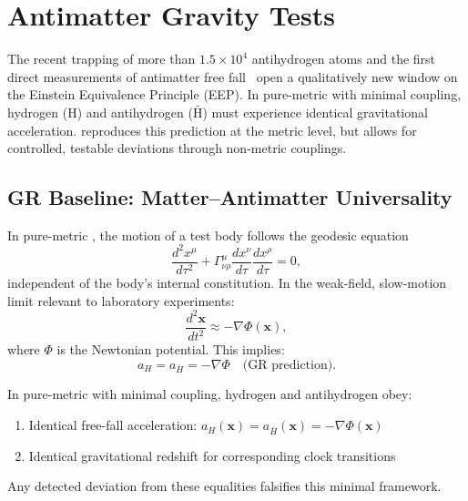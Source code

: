 
\section{Antimatter Gravity Tests}\label{sec:antimatter}

The recent trapping of more than $1.5 \times 10^4$ antihydrogen atoms and the 
first direct measurements of antimatter free fall~\cite{ALPHA2023Nature,ALPHA2025NatComm} 
open a qualitatively new window on the Einstein Equivalence Principle (EEP). 
In pure-metric \GR with minimal coupling, hydrogen (H) and antihydrogen 
($\bar{\text{H}}$) must experience identical gravitational acceleration. 
\DFD reproduces this prediction at the metric level, but allows for 
controlled, testable deviations through non-metric couplings.

\subsection{GR Baseline: Matter--Antimatter Universality}\label{sec:antimatter-gr}

In pure-metric \GR, the motion of a test body follows the geodesic equation
\begin{equation}
\frac{d^2 x^\mu}{d\tau^2} + \Gamma^\mu_{\nu\rho}\frac{dx^\nu}{d\tau}\frac{dx^\rho}{d\tau} = 0,
\end{equation}
independent of the body's internal constitution. In the weak-field, slow-motion 
limit relevant to laboratory experiments:
\begin{equation}
\frac{d^2\mathbf{x}}{dt^2} \approx -\nabla\Phi(\mathbf{x}),
\end{equation}
where $\Phi$ is the Newtonian potential. This implies:
\begin{equation}
a_H = a_{\bar{H}} = -\nabla\Phi \quad \text{(GR prediction)}.
\label{eq:gr-universality}
\end{equation}

\begin{definition}\label{def:gr-universality}
In pure-metric \GR with minimal coupling, hydrogen and antihydrogen obey:
\begin{enumerate}
\item Identical free-fall acceleration: $a_H(\mathbf{x}) = a_{\bar{H}}(\mathbf{x}) = -\nabla\Phi(\mathbf{x})$
\item Identical gravitational redshift for corresponding clock transitions
\end{enumerate}
Any detected deviation from these equalities falsifies this minimal framework.
\end{definition}

